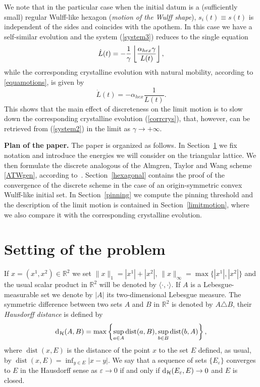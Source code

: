\documentclass{interact}
\numberwithin{equation}{section}
\theoremstyle{definition}
\newcommand{\R}{\mathbb{R}}
\renewcommand{\epsilon}{\varepsilon}
\DeclareMathOperator{\dist}{dist}
\begin{document}
We note that in the particular case when the initial datum is a (sufficiently small) regular Wulff-like hexagon (\emph{motion of the Wulff shape}), $s_i(t)\equiv s(t)$ is independent of the sides and coincides with the apothem. In this case we have a self-similar evolution and the system (\ref{system3}) reduces to the single equation
\begin{equation}\label{system2}
\dot{L}(t)=-{1\over \gamma}\left\lfloor\frac{\alpha_{hex}\gamma}{L(t)}\right\rfloor,
\end{equation}
while the corresponding crystalline evolution with natural mobility, according to \eqref{equamotions}, is given by
\begin{equation}
\dot{L}(t)=-\alpha_{hex}\frac{1}{L(t)}.
\label{corrcrys}
\end{equation}
This shows that the main effect of discreteness on the limit motion is to slow down the corresponding crystalline evolution (\ref{corrcrys}), that, however, can be retrieved from (\ref{system2}) in the limit as $\gamma\to+\infty$.



\noindent
{\bf Plan of the paper.} The paper is organized as follows. In Section~\ref{setting} we fix notation and introduce the energies we will consider on the triangular lattice. We then formulate the discrete analogous of the Almgren, Taylor and Wang scheme \eqref{ATWgen}, according to~\cite{BGN}. Section~\ref{hexagonal} contains the proof of the convergence of the discrete scheme in the case of an origin-symmetric convex Wulff-like initial set. %
In Section~\ref{pinning} we compute the pinning threshold and the description of the  limit motion is contained in Section~\ref{limitmotion}, where we also compare it with the corresponding crystalline evolution. %

\section{Setting of the problem}\label{setting}


If $x=(x^1,x^2)\in \R^2$ we set $\|x\|_1=|x^1|+|x^2|$, $\|x\|_\infty=\max\{|x^1|,|x^2|\}$ and the usual scalar product in $\R^2$ will be denoted by $\langle\cdot,\cdot\rangle$. If $A$ is a Le\-bes\-gue\hbox{-}measurable set we denote by $|A|$ its two\hbox{-}dimensional Lebesgue measure. The symmetric difference between two sets $A$ and $B$ in $\mathbb{R}^2$ is denoted by $A\triangle B$, their \emph{Hausdorff distance} is defined by
\begin{equation*}
{\rm d}_\mathcal{H}(A,B)=\max\left\{\sup_{a\in A}\dist(a,B), \sup_{b\in B}\dist(b,A)\right\},
\end{equation*}
where $\dist(x,E)$ is the distance of the point $x$ to the set $E$ defined, as usual, by $\dist(x,E)=\inf_{y\in E}|x-y|$. We say that a sequence of sets $\{E_\epsilon\}$ converges to $E$ in the Hausdorff sense as $\epsilon\to0$ if and only if ${\rm d}_{\mathcal H}(E_\epsilon,E)\to0$ and $E$ is closed.
\end{document}
